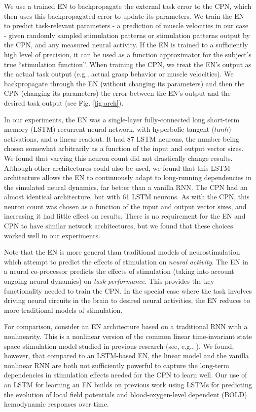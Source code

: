 \documentclass[12pt]{iopart}
\begin{document}
We use a trained EN to backpropagate the external task error to the CPN, which then uses this backpropagated
error to update its parameters. We train the EN to predict task-relevant parameters - a prediction of muscle
velocities in our case - given randomly sampled stimulation patterns or stimulation
patterns output by the CPN, and any measured neural activity. If the EN is trained to a sufficiently
high level of precision, it can be used as a function approximator for the subject's true ``stimulation function''.
When training the CPN, we treat the EN's output as the actual task output (e.g., actual grasp
behavior or muscle velocities). We backpropagate through the EN (without changing its parameters) and then the
CPN (changing its parameters) the error between the EN's output and the desired task output (see Fig. \ref{fig:arch}). 

In our experiments, the EN was a single-layer fully-connected long short-term memory (LSTM) recurrent
neural network, with hyperbolic tangent ($tanh$) activations, and a linear readout. It had 87 LSTM neurons,
the number being chosen somewhat arbitrarily as a function of the input and output vector sizes. We found that
varying this neuron count did not drastically change results. Although other architectures could also be used,
we found that this LSTM architecture allows the EN to continuously adapt to long-running dependencies in the
simulated neural dynamics, far better than a vanilla RNN. The CPN had an almost identical architecture, but with
61 LSTM neurons. As with the CPN, this neuron count was chosen as a function of the input and output vector sizes,
and increasing it had little effect on results. There is no requirement for the EN and CPN to have similar network
architectures, but we found that these choices worked well in our experiments.

Note that the EN is more general than traditional models of neurostimulation which attempt to predict the effects of
stimulation on { \em neural activity}. The EN in a neural co-processor predicts the effects of stimulation (taking into
account ongoing neural dynamics) on {\em task performance}. This provides the key functionality needed to train the
CPN. In the special case where the task involves driving neural circuits in the brain to desired neural activities,
the EN reduces to more traditional models of stimulation.

For comparison, consider an EN architecture based on a traditional RNN with a nonlinearity. This is a nonlinear version
of the common linear time-invariant state space stimulation model studied in previous research (see, e.g., \cite{shanechi.stimmodel}). 
We found, however, that compared to an LSTM-based EN, the linear model and the vanilla nonlinear RNN are both not
sufficiently powerful to capture the long-term dependencies in stimulation effects needed for the CPN to learn well.
Our use of an LSTM for learning an EN builds on previous work using LSTMs for predicting the evolution of local field
potentials \cite{kim.lstm} and blood-oxygen-level dependent (BOLD) hemodynamic responses \cite{guclu.lstm} over time.
\end{document}
